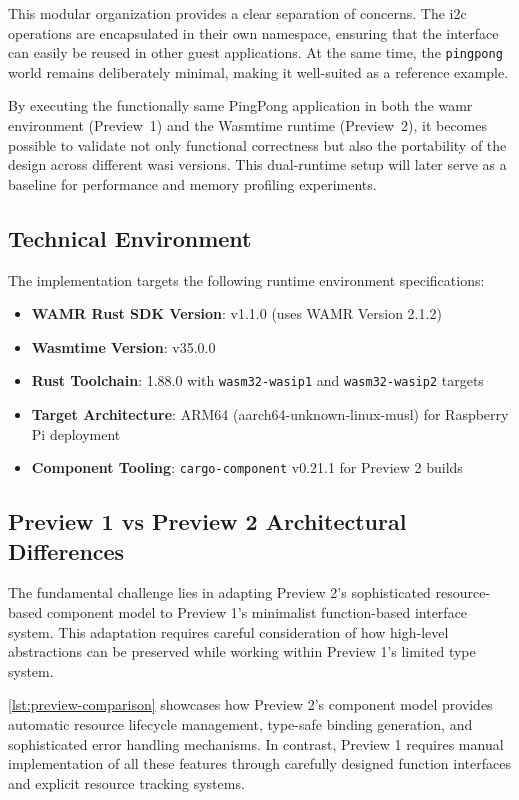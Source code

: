 This modular organization provides a clear separation of concerns. The \acrshort{i2c} operations are encapsulated in their own namespace, ensuring that the interface can easily be reused in other guest applications. At the same time, the \texttt{pingpong} world remains deliberately minimal, making it well-suited as a reference example.  

By executing the functionally same PingPong application in both the \acrshort{wamr} environment (Preview~1) and the Wasmtime runtime (Preview~2), it becomes possible to validate not only functional correctness but also the portability of the design across different \acrshort{wasi} versions. This dual-runtime setup will later serve as a baseline for performance and memory profiling experiments.

\subsection{Technical Environment}

The implementation targets the following runtime environment specifications:

\begin{itemize}
    \item \textbf{WAMR Rust SDK Version}: v1.1.0 (uses WAMR Version 2.1.2)
    \item \textbf{Wasmtime Version}: v35.0.0
    \item \textbf{Rust Toolchain}: 1.88.0 with \texttt{wasm32-wasip1} and \texttt{wasm32-wasip2} targets
    \item \textbf{Target Architecture}: ARM64 (aarch64-unknown-linux-musl) for Raspberry Pi deployment
    \item \textbf{Component Tooling}: \texttt{cargo-component} v0.21.1 for Preview 2 builds
\end{itemize}

\subsection{Preview 1 vs Preview 2 Architectural Differences}

The fundamental challenge lies in adapting Preview 2's sophisticated resource-based component model to Preview 1's minimalist function-based interface system. This adaptation requires careful consideration of how high-level abstractions can be preserved while working within Preview 1's limited type system.

\autoref{lst:preview-comparison} showcases how Preview 2's component model provides automatic resource lifecycle management, type-safe binding generation, and sophisticated error handling mechanisms. In contrast, Preview 1 requires manual implementation of all these features through carefully designed function interfaces and explicit resource tracking systems.

